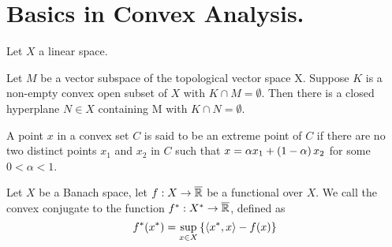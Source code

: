 \chapter{Basics in Convex Analysis.}
\begin{definition}[Variety]
\end{definition}
\begin{definition}[Convexity]
Let $X$ a linear space. 
\end{definition}
\begin{definition}
\end{definition}
\begin{definition}
\end{definition}

\begin{theorem}
\end{theorem}

\begin{theorem}
	Let $M$ be a vector subspace of the topological vector space X. Suppose $K$ is a non-empty convex open subset of $X$ with $K\cap M=\emptyset$. Then there is a closed hyperplane $N \in X$ containing M with $K \cap N = \emptyset$.
\end{theorem}

\begin{definition}[Cone]
	
\end{definition}


\begin{definition}
A point $x$ in a convex set $C$ is said to be an extreme point of $C$ if there are no two distinct points $x_1$ and $x_2$ in $C$ such that $x = \alpha x_1 + \left( 1-\alpha \right)x_2$ for some $0<\alpha <1$.
\end{definition}

\begin{definition}
Let $X$ be a Banach space, let $f:X\rightarrow \overline{\mathbb{R}}$ be a functional over $X$. We call the convex conjugate to the function ${f}^*: {X}^*\rightarrow \overline{\mathbb{R}}$, defined as
\begin{equation*}
	{f}^*({x}^*)=\sup_{x\in X} \left\lbrace \left\langle {x}^*, x \right\rangle-f(x) \right\rbrace
\end{equation*}	
\end{definition}

